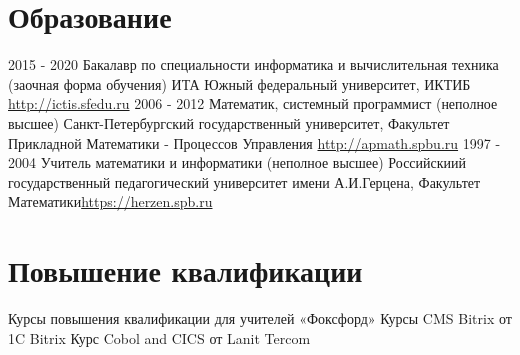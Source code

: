 \documentclass[11pt,a4paper]{moderncv}
\begin{document}
\section{Образование}
  \cventry
    {2015 - 2020}%
    {Бакалавр по специальности информатика и вычислительная техника (заочная форма обучения)}
    {\newline{} ИТА Южный федеральный университет, ИКТИБ}
    {\url{http://ictis.sfedu.ru}}{}{}
  \cventry
    {2006 - 2012}%
    {Математик, системный программист (неполное высшее)}
    {\newline{} Санкт-Петербургский государственный университет, Факультет Прикладной \newline{}Математики - Процессов Управления}
    {\url{http://apmath.spbu.ru}}{}{}
  \cventry
    {1997 - 2004}%
    {Учитель математики и информатики (неполное высшее)}
    {\newline{}Российскиий государственный педагогический университет имени А.И.Герцена, Факультет Математики}{\url{https://herzen.spb.ru}}{}{}
  \section{Повышение квалификации}
  \cventry
    {}%
    {Курсы повышения квалификации для учителей «Фоксфорд»}{}
    {}{}{}
\cventry
    {}
    {Курсы CMS Bitrix от 1C Bitrix}
    {}
    {}{}{}
  \cventry
    {}
    {Курс Cobol and CICS от Lanit Tercom}
    {}
    {}{}{}
\end{document}
